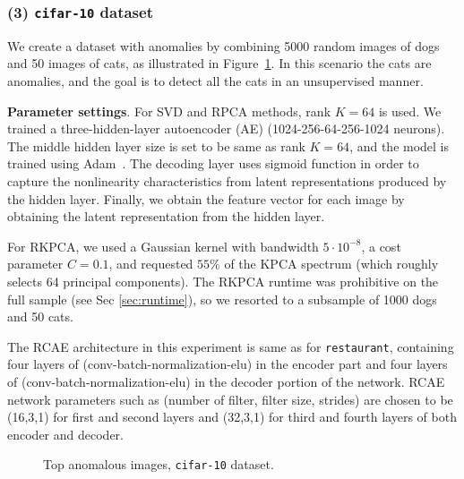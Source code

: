 \subsubsection{{(3) {\tt cifar-10} dataset}}
We create a dataset with anomalies
by combining 5000 random images of dogs and 50 images of cats, as illustrated in Figure~\ref{fig:results-cifar}.
In this scenario the cats are anomalies, and the goal is to detect all the cats in an unsupervised manner.

\textbf{Parameter settings}.
For SVD and RPCA methods, rank $K = 64$ is used.
We trained a three-hidden-layer autoencoder (AE) (1024-256-64-256-1024 neurons).
The middle hidden layer size is set to be same as rank $K = 64$, %
and the model is trained using Adam~\cite{kingma2014adam}.
The decoding layer uses sigmoid function in order to capture the nonlinearity characteristics from  latent representations produced by the hidden layer.
Finally, we obtain the feature vector for each image by obtaining the latent representation from the hidden layer.

For RKPCA, we used a Gaussian kernel with bandwidth $5 \cdot 10^{-8}$, a cost parameter $C = 0.1$, and requested $55\%$ of the KPCA spectrum (which roughly selects 64 principal components).
The RKPCA runtime was prohibitive on the full sample (see Sec \ref{sec:runtime}), so we resorted to a subsample of 1000 dogs and 50 cats.

The RCAE architecture in this experiment is same as for {\tt restaurant}, containing
four layers of  (conv-batch-normalization-elu) in the encoder part
and four layers of  (conv-batch-normalization-elu) in the decoder
portion of the network. RCAE network parameters such as (number of filter, filter size, strides) are chosen to be (16,3,1)  for first and second layers and (32,3,1) for third and fourth layers of both encoder and decoder.

\begin{figure}[!t]
	\centering
	\caption{Top anomalous images, %
	{\tt cifar-10} dataset.}
	\label{fig:results-cifar}
\end{figure}

